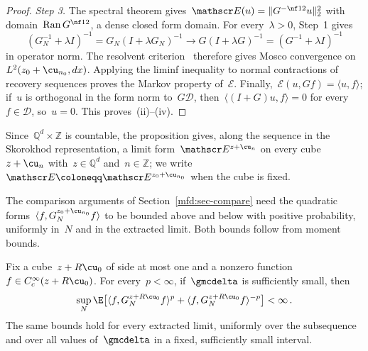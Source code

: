 \documentclass[11pt]{amsart}
\begin{document}
\begin{proof}
\smallskip

\emph{Step 3.} The spectral theorem gives~$\mathscr E(u)=\|G^{-\nf12}u\|_2^2$ with domain~$\operatorname{Ran}G^{\nf12}$, a dense closed form domain. For every~$\lambda>0$, Step~1 gives
\begin{equation*}
	(G_N^{-1}+\lambda I)^{-1}=G_N(I+\lambda G_N)^{-1}
	\longrightarrow G(I+\lambda G)^{-1}=(G^{-1}+\lambda I)^{-1}
\end{equation*}
in operator norm. The resolvent criterion~\citep[Theorem~2.4]{KuwaeShioya2003} therefore gives Mosco convergence on~$L^2(z_0+\cu_{n_0},dx)$. Applying the liminf inequality to normal contractions of recovery sequences proves the Markov property of~$\mathscr E$. Finally,~$\mathscr E(u,Gf)=\langle u,f\rangle$; if~$u$ is orthogonal in the form norm to~$G\mathcal D$, then~$\langle(I+G)u,f\rangle=0$ for every~$f\in\mathcal D$, so~$u=0$. This proves~(ii)--(iv).
\end{proof}

Since~$\mathbb Q^d\times\mathbb Z$ is countable, the proposition gives, along the sequence in the Skorokhod representation, a limit form~$\mathscr E^{z+\cu_n}$ on every cube~$z+\cu_n$ with~$z\in\mathbb Q^d$ and~$n\in\mathbb Z$; we write~$\mathscr E\coloneqq \mathscr E^{z_0+\cu_{n_0}}$ when the cube is fixed.

\smallskip

The comparison arguments of Section~\ref{mfd:sec-compare} need the quadratic forms~$\langle f,G_N^{z_0+\cu_{n_0}}f\rangle$ to be bounded above and below with positive probability, uniformly in~$N$ and in the extracted limit. Both bounds follow from moment bounds.

\begin{lemma}
\label{mfd:lem-response-reciprocal}
Fix a cube~$z+R\cu_0$ of side at most one and a nonzero function~$f\in C_c^\infty(z+R\cu_0)$. For every~$p<\infty$, if~$\gmcdelta$ is sufficiently small, then
\begin{equation*}
	\sup_N\E\bigl[\langle f,G_N^{z+R\cu_0}f\rangle^p+\langle f,G_N^{z+R\cu_0}f\rangle^{-p}\bigr]<\infty\,.
\end{equation*}
The same bounds hold for every extracted limit, uniformly over the subsequence and over all values of~$\gmcdelta$ in a fixed, sufficiently small interval.
\end{lemma}
\end{document}
